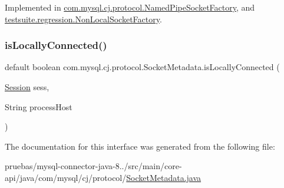 Implemented in \mbox{\hyperlink{classcom_1_1mysql_1_1cj_1_1protocol_1_1_named_pipe_socket_factory_a4b84ec480d8301d7299bfc9ef2ef58ec}{com.\+mysql.\+cj.\+protocol.\+Named\+Pipe\+Socket\+Factory}}, and \mbox{\hyperlink{classtestsuite_1_1regression_1_1_non_local_socket_factory_a6777c5f47cc9b67f228c1b4cbf46d18d}{testsuite.\+regression.\+Non\+Local\+Socket\+Factory}}.

\mbox{\label{interfacecom_1_1mysql_1_1cj_1_1protocol_1_1_socket_metadata_a4fd9ea6b94011181271df349c840ecf0}} 
\subsubsection{\texorpdfstring{is\+Locally\+Connected()}{isLocallyConnected()}\hspace{0.1cm}{\footnotesize\ttfamily [2/2]}}
{\footnotesize\ttfamily default boolean com.\+mysql.\+cj.\+protocol.\+Socket\+Metadata.\+is\+Locally\+Connected (\begin{DoxyParamCaption}\item[{\mbox{\hyperlink{interfacecom_1_1mysql_1_1cj_1_1_session}{Session}}}]{sess,  }\item[{String}]{process\+Host }\end{DoxyParamCaption})}



The documentation for this interface was generated from the following file\+:\begin{DoxyCompactItemize}
\item 
pruebas/mysql-\/connector-\/java-\/8../src/main/core-\/api/java/com/mysql/cj/protocol/\mbox{\hyperlink{_socket_metadata_8java}{Socket\+Metadata.\+java}}\end{DoxyCompactItemize}
